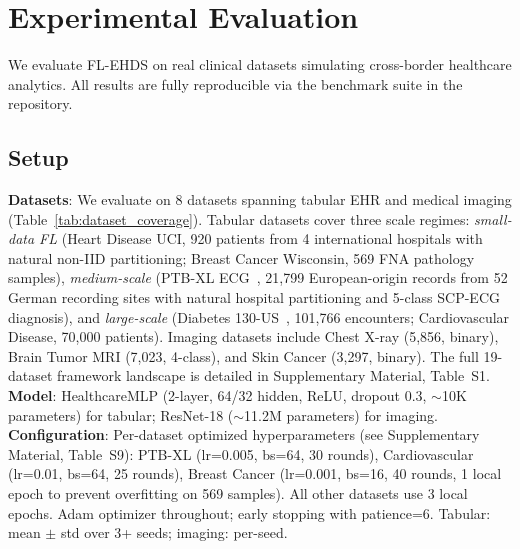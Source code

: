 \documentclass[conference,a4paper]{IEEEtran}
\begin{document}
\section{Experimental Evaluation}
\label{sec:experiments}

We evaluate FL-EHDS on real clinical datasets simulating cross-border healthcare analytics. All results are fully reproducible via the benchmark suite in the repository.

\subsection{Setup}

\textbf{Datasets}: We evaluate on 8 datasets spanning tabular EHR and medical imaging (Table~\ref{tab:dataset_coverage}). Tabular datasets cover three scale regimes: \textit{small-data FL} (Heart Disease UCI, 920 patients from 4 international hospitals with natural non-IID partitioning; Breast Cancer Wisconsin, 569 FNA pathology samples), \textit{medium-scale} (PTB-XL ECG~\cite{wagner2020ptbxl}, 21,799 European-origin records from 52 German recording sites with natural hospital partitioning and 5-class SCP-ECG diagnosis), and \textit{large-scale} (Diabetes 130-US~\cite{strack2014diabetes}, 101,766 encounters; Cardiovascular Disease, 70,000 patients). Imaging datasets include Chest X-ray (5,856, binary), Brain Tumor MRI (7,023, 4-class), and Skin Cancer (3,297, binary). The full 19-dataset framework landscape is detailed in Supplementary Material, Table~S1. \textbf{Model}: HealthcareMLP (2-layer, 64/32 hidden, ReLU, dropout 0.3, $\sim$10K parameters) for tabular; ResNet-18 ($\sim$11.2M parameters) for imaging. \textbf{Configuration}: Per-dataset optimized hyperparameters (see Supplementary Material, Table~S9): PTB-XL (lr=0.005, bs=64, 30 rounds), Cardiovascular (lr=0.01, bs=64, 25 rounds), Breast Cancer (lr=0.001, bs=16, 40 rounds, 1 local epoch to prevent overfitting on 569 samples). All other datasets use 3 local epochs. Adam optimizer throughout; early stopping with patience=6. Tabular: mean $\pm$ std over 3+ seeds; imaging: per-seed.
\end{document}
